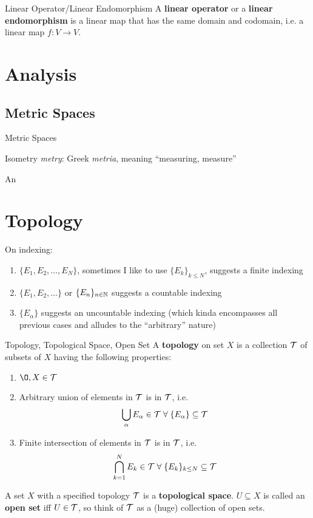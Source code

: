 \documentclass[a4paper, 10pt]{article}
\begin{document}
\begin{definition} {Linear Operator/Linear Endomorphism}
    A \textbf{linear operator} or a \textbf{linear endomorphism} is a linear map that has the same domain and codomain, i.e. a linear map \(f: V \to V\).
\end{definition}
\section{Analysis}
\subsection{Metric Spaces}
\begin{definition} {Metric Spaces}

\end{definition}
\begin{definition} {Isometry}
    \textit{metry}: Greek \textit{metria}, meaning ``measuring, measure''

    An \(\)
\end{definition}

\section{Topology}
\begin{remark}
    On indexing: \begin{enumerate}
        \item \(\{E_1, E_2, \dots, E_N\}\), sometimes I like to use \(\{{E_k}\}_{k\leq N}\), suggests a finite indexing
        \item \(\{E_1, E_2, \dots\}\) or \(\{E_n\}_{n \in \mathbb{N}}\) suggests a countable indexing
        \item \(\{E_\alpha\}\) suggests an uncountable indexing (which kinda encompasses all previous cases and alludes to the ``arbitrary'' nature)
    \end{enumerate}
\end{remark}
\begin{definition} {Topology, Topological Space, Open Set}
    A \textbf{topology} on set \(X\) is a collection \(\mathcal{T}\) of subsets of \(X\) having the following properties:
    \begin{enumerate}
        \item \(\O, X \in \calt\)
        \item Arbitrary union of elements in \(\mathcal{T}\) is in \(\mathcal{T}\), i.e. \[
                  \bigcup_\alpha E_\alpha \in \calt \forall \{E_\alpha\} \subseteq \calt
              \]
        \item Finite intersection of elements in \(\mathcal{T}\) is in \(\mathcal{T}\), i.e. \[
                  \bigcap_{k=1}^N E_k \in \calt \forall \{E_k\}_{k \leq N} \subseteq \calt
              \]
    \end{enumerate}
    A set \(X\) with a specified topology \(\mathcal{T}\) is a \textbf{topological space}. \(U \subseteq X\) is called an \textbf{open set} iff \(U \in \mathcal{T}\), so think of \(\mathcal{T}\) as a (huge) collection of open sets.
\end{definition}
\end{document}
